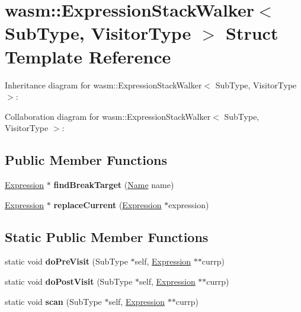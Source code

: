 \hypertarget{structwasm_1_1_expression_stack_walker}{}\section{wasm\+:\+:Expression\+Stack\+Walker$<$ Sub\+Type, Visitor\+Type $>$ Struct Template Reference}
\label{structwasm_1_1_expression_stack_walker}


Inheritance diagram for wasm\+:\+:Expression\+Stack\+Walker$<$ Sub\+Type, Visitor\+Type $>$\+:


Collaboration diagram for wasm\+:\+:Expression\+Stack\+Walker$<$ Sub\+Type, Visitor\+Type $>$\+:
\subsection*{Public Member Functions}
\begin{DoxyCompactItemize}
\item 
\mbox{\label{structwasm_1_1_expression_stack_walker_a9959edf55c45f96580cfce7114da181d}} 
\mbox{\hyperlink{classwasm_1_1_expression}{Expression}} $\ast$ {\bfseries find\+Break\+Target} (\mbox{\hyperlink{structwasm_1_1_name}{Name}} name)
\item 
\mbox{\label{structwasm_1_1_expression_stack_walker_a898c6a5f8fe394e27ac9deb11882ec51}} 
\mbox{\hyperlink{classwasm_1_1_expression}{Expression}} $\ast$ {\bfseries replace\+Current} (\mbox{\hyperlink{classwasm_1_1_expression}{Expression}} $\ast$expression)
\end{DoxyCompactItemize}
\subsection*{Static Public Member Functions}
\begin{DoxyCompactItemize}
\item 
\mbox{\label{structwasm_1_1_expression_stack_walker_ad2b7ae469ea0d419c1a7fe71d47ac7bc}} 
static void {\bfseries do\+Pre\+Visit} (Sub\+Type $\ast$self, \mbox{\hyperlink{classwasm_1_1_expression}{Expression}} $\ast$$\ast$currp)
\item 
\mbox{\label{structwasm_1_1_expression_stack_walker_ae119f05a8c0fe7b49421f086abcb3cde}} 
static void {\bfseries do\+Post\+Visit} (Sub\+Type $\ast$self, \mbox{\hyperlink{classwasm_1_1_expression}{Expression}} $\ast$$\ast$currp)
\item 
\mbox{\label{structwasm_1_1_expression_stack_walker_abbb1e5fb957f032c6f3d9f27e0f15a1f}} 
static void {\bfseries scan} (Sub\+Type $\ast$self, \mbox{\hyperlink{classwasm_1_1_expression}{Expression}} $\ast$$\ast$currp)
\end{DoxyCompactItemize}
